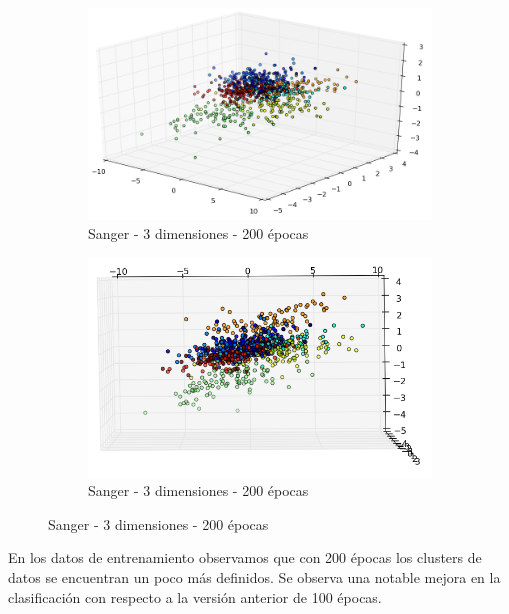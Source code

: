\newpage

\begin{figure}[!htbp]
\centering
\begin{subfigure}{.5\textwidth}
  \centering
  \includegraphics[width=1\linewidth, scale=1]{../img/ej1/sanger/sanger_3salida_200ep_train.png}
  \caption{Sanger - 3 dimensiones - 200 épocas}
  \label{fig:sub1}
\end{subfigure}%
\begin{subfigure}{.5\textwidth}
  \centering
  \includegraphics[width=1\linewidth, scale=1]{../img/ej1/sanger/sanger_3salida_200ep_train_3.png}
  \caption{Sanger - 3 dimensiones - 200 épocas}
  \label{fig:sub2}
\end{subfigure}
\end{figure}

En los datos de entrenamiento observamos que con 200 épocas los clusters de datos se encuentran un poco más definidos. 
Se observa una notable mejora en la clasificación con respecto a la versión anterior de 100 épocas.


